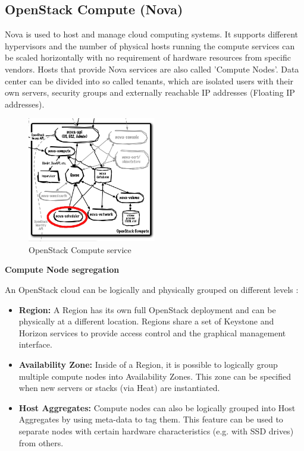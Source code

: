 \subsection{OpenStack Compute (Nova)}

Nova is used to host and manage cloud computing systems. It supports different hypervisors and the number of physical hosts running the compute services can be scaled horizontally with no requirement of hardware resources from specific vendors. Hosts that provide Nova services are also called 'Compute Nodes'. Data center can be divided into so called tenants, which are isolated users with their own servers, security groups and externally reachable IP addresses (Floating IP addresses). 

\begin{figure}[H]
\centering
\includegraphics[width=0.5\textwidth]{images/fundamentals/openstack_nova.png}
\caption{OpenStack Compute service}
\end{figure}

\textbf{Compute Node segregation}

An OpenStack cloud can be logically and physically grouped on different levels \cite{openstack-ops}:
\begin{itemize}
\item \textbf{Region:} A Region has its own full OpenStack deployment and can be physically at a different location. Regions share a set of Keystone and Horizon services to provide access control and the graphical management interface.
\item \textbf{Availability Zone:} Inside of a Region, it is possible to logically group multiple compute nodes into Availability Zones. This zone can be specified when new servers or stacks (via Heat) are instantiated.
\item \textbf{Host Aggregates:} Compute nodes can also be logically grouped into Host Aggregates by using meta-data to tag them. This feature can be used to separate nodes with certain hardware characteristics (e.g. with SSD drives) from others.
\end{itemize}

